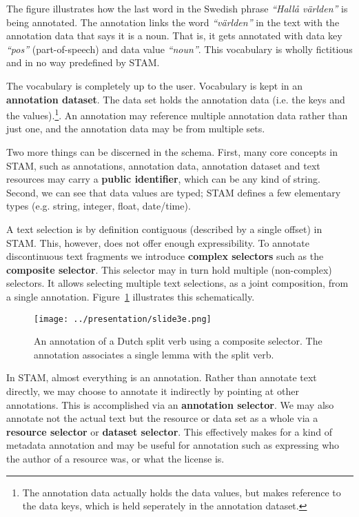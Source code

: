 \documentclass{jors}
\begin{document}
The figure illustrates how the last word in the Swedish phrase \emph{``Hallå
världen''} is being annotated. The annotation links the word \emph{``världen''}
in the text with the annotation data that says it is a noun. That is, it gets
annotated with data key \emph{``pos''} (part-of-speech) and data value
\emph{``noun''}. This vocabulary is wholly fictitious and in no way predefined
by STAM. 

The vocabulary is completely up to the user. Vocabulary is kept in an
\textbf{annotation dataset}. The data set holds the annotation data (i.e. the
keys and the values).\footnote{The annotation data actually holds the data values, but
makes reference to the data keys, which is held seperately in the annotation
dataset.}. An annotation may reference multiple annotation data rather than
just one, and the annotation data may be from multiple sets.

Two more things can be discerned in the schema. First, many core concepts in
STAM, such as annotations, annotation data, annotation dataset and text
resources may carry a \textbf{public identifier}, which can be any kind of
string. Second, we can see that data values are typed; STAM defines
a few elementary types (e.g. string, integer, float, date/time).

A text selection is by definition contiguous (described by a single offset) in
STAM. This, however, does not offer enough expressibility. To annotate
discontinuous text fragments we introduce \textbf{complex selectors} such as
the \textbf{composite selector}. This selector may in turn hold multiple (non-complex)
selectors. It allows selecting multiple text selections, as a joint composition,
from a single annotation. Figure~\ref{fig:modelintro2} illustrates this
schematically.

\begin{figure}[h]
\texttt{[image: ../presentation/slide3e.png]}
\caption{An annotation of a Dutch split verb using a composite selector. The annotation associates a single lemma with the split verb.}
\label{fig:modelintro2}
\end{figure}

In STAM, almost everything is an annotation. Rather than annotate text
directly, we may choose to annotate it indirectly by pointing at other
annotations. This is accomplished via an \textbf{annotation selector}. We may
also annotate not the actual text but the resource or data set as a whole via a
\textbf{resource selector} or \textbf{dataset selector}. This effectively makes
for a kind of metadata annotation and may be useful for annotation such as
expressing who the author of a resource was, or what the license is.
\end{document}

